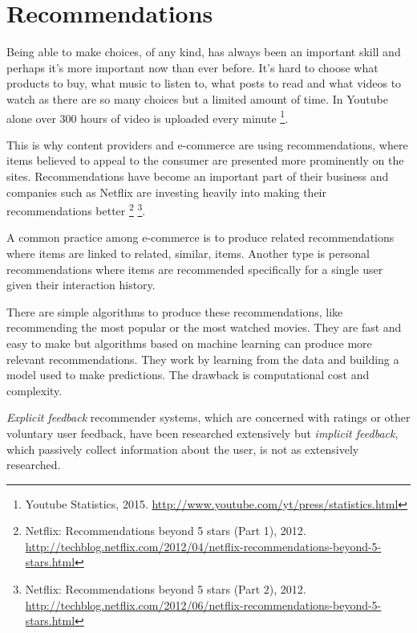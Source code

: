 
\section{Recommendations}

Being able to make choices, of any kind, has always been an important skill and perhaps it's more important now than ever before. It's hard to choose what products to buy, what music to listen to, what posts to read and what videos to watch as there are so many choices but a limited amount of time. In Youtube alone over 300 hours of video is uploaded every minute
\footnote{Youtube Statistics, 2015. \url{http://www.youtube.com/yt/press/statistics.html}}.

This is why content providers and e-commerce are using recommendations, where items believed to appeal to the consumer are presented more prominently on the sites. Recommendations have become an important part of their business and companies such as Netflix are investing heavily into making their recommendations better
\footnote{
Netflix: Recommendations beyond 5 stars (Part 1), 2012. \\
\url{http://techblog.netflix.com/2012/04/netflix-recommendations-beyond-5-stars.html}
}
\footnote{
Netflix: Recommendations beyond 5 stars (Part 2), 2012. \\
\url{http://techblog.netflix.com/2012/06/netflix-recommendations-beyond-5-stars.html}
}.

A common practice among e-commerce is to produce related recommendations where items are linked to related, similar, items. Another type is personal recommendations where items are recommended specifically for a single user given their interaction history.

There are simple algorithms to produce these recommendations, like recommending the most popular or the most watched movies. They are fast and easy to make but algorithms based on machine learning can produce more relevant recommendations. They work by learning from the data and building a model used to make predictions. The drawback is computational cost and complexity.

\textit{Explicit feedback} recommender systems, which are concerned with ratings or other voluntary user feedback, have been researched extensively but \textit{implicit feedback}, which passively collect information about the user, is not as extensively researched. \citep{hu2008collaborative, bobadilla2013recommender}

